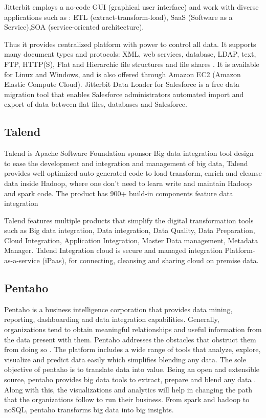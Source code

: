    Jitterbit employs a no-code GUI (graphical user interface) and
    work with diverse applications such as : ETL
    (extract-transform-load), SaaS (Software as a Service),SOA
    (service-oriented architecture).

    Thus it provides centralized platform with power to control all
    data. It supports many document types and protocols: XML, web
    services, database, LDAP, text, FTP, HTTP(S), Flat and Hierarchic
    file structures and file shares \cite{tech-manual}. It is
    available for Linux and Windows, and is also offered through
    Amazon EC2 (Amazon Elastic Compute Cloud). Jitterbit Data Loader
    for Salesforce is a free data migration tool that enables
    Salesforce administrators automated import and export of data
    between flat files, databases and Salesforce.

    \pv

\subsection{Talend}

    Talend is Apache Software Foundation sponsor Big data integration
    tool design to ease the development and integration and management
    of big data, Talend provides well optimized auto generated code to
    load transform, enrich and cleanse data inside Hadoop, where one
    don’t need to learn write and maintain Hadoop and spark code.  The
    product has 900+ build-in components feature data integration
     
    Talend features multiple products that simplify the digital
    transformation tools such as Big data integration, Data
    integration, Data Quality, Data Preparation, Cloud Integration,
    Application Integration, Master Data management, Metadata Manager.
    Talend Integration cloud is secure and managed integration
    Platform-as-a-service (iPaas), for connecting, cleansing and
    sharing cloud on premise data.

    \pv

\subsection{Pentaho}

    Pentaho is a business intelligence corporation that provides data
    mining, reporting, dashboarding and data integration
    capabilities. Generally, organizations tend to obtain meaningful
    relationships and useful information from the data present with
    them. Pentaho addresses the obstacles that obstruct them from
    doing so \cite{pent1}. The platform includes a wide range of
    tools that analyze, explore, visualize and predict data easily
    which simplifies blending any data. The sole objective of pentaho
    is to translate data into value. Being an open and extensible
    source, pentaho provides big data tools to extract, prepare and
    blend any data \cite{pent2}. Along with this, the visualizations
    and analytics will help in changing the path that the
    organizations follow to run their business. From spark and hadoop
    to noSQL, pentaho transforms big data into big insights.

